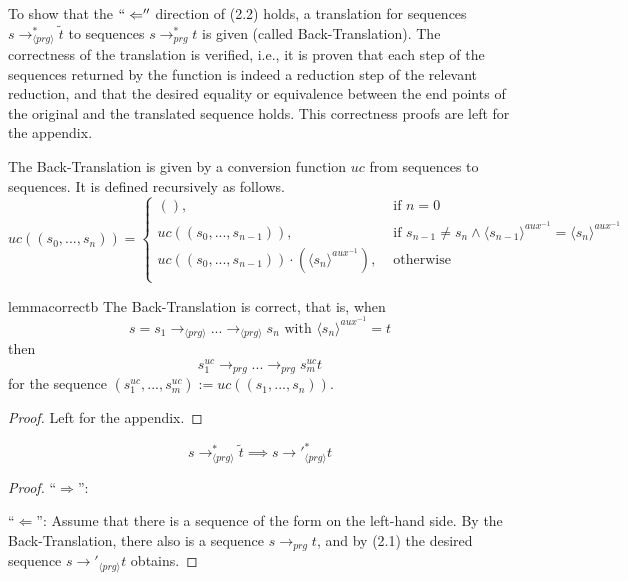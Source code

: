 To show that the $`` \Leftarrow ''$ direction of (2.2) holds, a translation for sequences $s \longrightarrow^*_{\langle prg \rangle} \widetilde{t}$ to sequences $s \longrightarrow^*_{prg} t$ is given (called Back-Translation). The correctness of the translation is verified, i.e., it is proven that each step of the sequences returned by the function is indeed a reduction step of the relevant reduction, and that the desired equality or equivalence between the end points of the original and the translated sequence holds. This correctness proofs are left for the appendix.

\begin{definition}
The Back-Translation is given by a conversion function $uc$ from sequences to sequences. It is defined recursively as follows.
\[
  uc((s_0, ..., s_n))=\begin{cases}
               (), &\text{ if } n = 0 \\
               uc((s_0, ..., s_{n-1})), &\text{ if } s_{n-1} \neq s_n \land \langle s_{n-1} \rangle^{aux^{-1}} = \langle s_n \rangle^{aux^{-1}} \\
               uc((s_0, ..., s_{n-1})) \cdot (\langle s_n \rangle^{aux^{-1}}), &\text{ otherwise} \\
            \end{cases}
\]

\end{definition}

\begin{restatable}{lemma}{correctb}
The Back-Translation is correct, that is, when
\[
s = s_1 {\longrightarrow}_{\langle prg \rangle} ... {\longrightarrow}_{\langle prg \rangle} s_n \text{ with } \langle s_n \rangle^{aux^{-1}} = t
\]
then
\[
s^{uc}_1 \longrightarrow_{prg} ... \longrightarrow_{prg} s^{uc}_m t
\]
for the sequence $(s^{uc}_1, ..., s^{uc}_m) := uc((s_1, ..., s_n))$.
\end{restatable}
\begin{proof}
Left for the appendix.
\end{proof}

\begin{lemma}
\[
 s \longrightarrow^*_{\langle prg \rangle} \widetilde{t} \implies s {\longrightarrow'}_{\langle prg \rangle}^* t
\]

\begin{proof}
``$\Rightarrow$'': 

``$\Leftarrow$'': Assume that there is a sequence of the form on the left-hand side. By the Back-Translation, there also is a sequence $s \longrightarrow_{prg} t$, and by (2.1) the desired sequence $s {\longrightarrow'}_{\langle prg \rangle} t$ obtains.

\end{proof}
\end{lemma}


